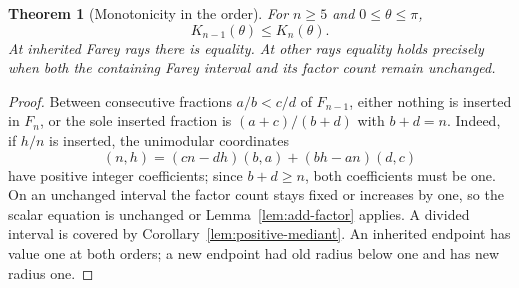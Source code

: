 \documentclass[11pt,a4paper]{article}
\newtheorem{theorem}{Theorem}[section]
\theoremstyle{definition}
\theoremstyle{remark}
\numberwithin{equation}{section}
\begin{document}
\begin{theorem}[Monotonicity in the order]\label{thm:order-monotonicity}
For $n\ge5$ and $0\le\theta\le\pi$,
\[
 K_{n-1}(\theta)\le K_n(\theta).
\]
At inherited Farey rays there is equality.
At other rays equality holds precisely when both the containing Farey interval and its factor count remain unchanged.
\end{theorem}
\begin{proof}
Between consecutive fractions $a/b<c/d$ of $F_{n-1}$, either nothing is inserted in $F_n$, or the sole inserted fraction is $(a+c)/(b+d)$ with $b+d=n$.
Indeed, if $h/n$ is inserted, the unimodular coordinates
\[
 (n,h)=(cn-dh)(b,a)+(bh-an)(d,c)
\]
have positive integer coefficients; since $b+d\ge n$, both coefficients must be one.
On an unchanged interval the factor count stays fixed or increases by one, so the scalar equation is unchanged or Lemma~\ref{lem:add-factor} applies.
A divided interval is covered by Corollary~\ref{lem:positive-mediant}.
An inherited endpoint has value one at both orders; a new endpoint had old radius below one and has new radius one.
\end{proof}
\end{document}
